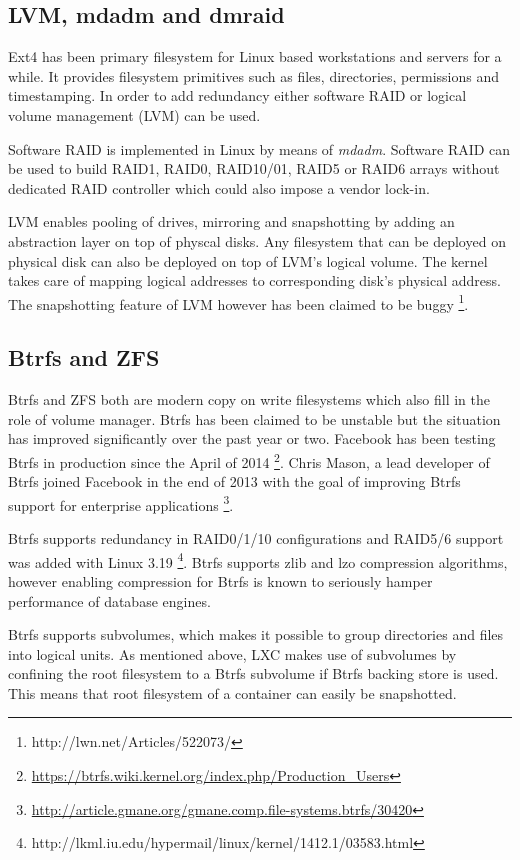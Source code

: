 \documentclass[a4paper,11pt]{kth-mag}
\begin{document}
\subsection{LVM, mdadm and dmraid}

Ext4 has been primary filesystem for Linux based workstations and
servers for a while. It provides filesystem primitives such as files,
directories, permissions and timestamping.
In order to add redundancy
either software RAID or logical volume management (LVM) can be used.

Software RAID is implemented in Linux by means of \emph{mdadm}.
Software RAID can be used to build RAID1, RAID0, RAID10/01, RAID5
or RAID6 arrays without dedicated RAID controller which could also
impose a vendor lock-in.

LVM enables pooling of drives, mirroring and snapshotting by adding
an abstraction layer on top of physcal disks. Any filesystem that
can be deployed on physical disk can also be deployed on top of
LVM's logical volume. The kernel takes care of mapping logical
addresses to corresponding disk's physical address.
The snapshotting feature of LVM however has been claimed to be buggy
\footnote{http://lwn.net/Articles/522073/}.

\subsection{Btrfs and ZFS}

Btrfs and ZFS both are modern copy on write filesystems
which also fill in the role of volume manager.
Btrfs has been claimed to be unstable but the situation has
improved significantly over the past year or two.
Facebook has been testing Btrfs in production since the April of 2014
\footnote{\url{https://btrfs.wiki.kernel.org/index.php/Production_Users}}.
Chris Mason, a lead developer of Btrfs joined Facebook
in the end of 2013 with the goal of improving Btrfs support
for enterprise applications
\footnote{\url{http://article.gmane.org/gmane.comp.file-systems.btrfs/30420}}.

Btrfs supports redundancy in RAID0/1/10 configurations and
RAID5/6 support was added with Linux 3.19
\footnote{http://lkml.iu.edu/hypermail/linux/kernel/1412.1/03583.html}.
Btrfs supports zlib and lzo compression algorithms,
however enabling compression for Btrfs is known to
seriously hamper performance of database engines.

Btrfs supports subvolumes, which makes it possible to group
directories and files into logical units.
As mentioned above, LXC makes use of subvolumes
by confining the root filesystem to a Btrfs subvolume
if Btrfs backing store is used.
This means that root filesystem of a container
can easily be snapshotted.
\end{document}

